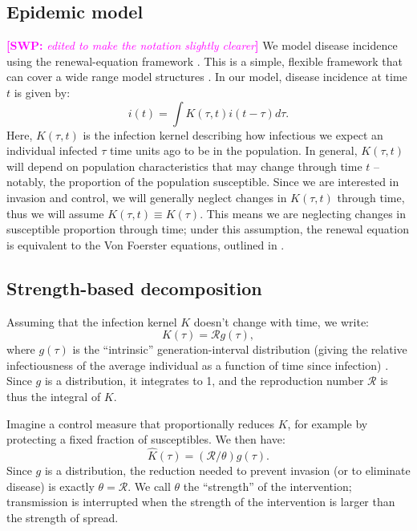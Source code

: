 \documentclass{article}\usepackage[]{graphicx}\usepackage[]{color}
\newcommand{\comment}[3]{\textcolor{#1}{\textbf{[#2: }\textit{#3}\textbf{]}}}
\newcommand{\swp}[1]{\comment{magenta}{SWP}{#1}}
\newcommand{\RR}{\ensuremath{{\mathcal R}}}
\newcommand{\eqlab}[1]{\label{eq:#1}}
\begin{document}
\subsection{Epidemic model}

\swp{edited to make the notation slightly clearer}
We model disease incidence using the renewal-equation framework \citep{champredon2015intrinsic}. 
This is a simple, flexible framework that can cover a wide range model structures \citep{Champredon2018equivalence}.
In our model, disease incidence at time $t$ is given by:
\begin{equation}
i(t) = \int K(\tau, t) i(t-\tau) d\tau.
\end{equation}
Here, $K(\tau, t)$ is the infection kernel describing how infectious we expect an individual infected $\tau$ time units ago to be in the population.
In general, $K(\tau, t)$ will depend on population characteristics that may change through time $t$ -- notably, the proportion of the population susceptible.
Since we are interested in invasion and control, we will generally neglect changes in $K(\tau, t)$ through time, thus we will assume $K(\tau, t) \equiv K(\tau)$. 
This means we are neglecting changes in susceptible proportion through time;
under this assumption, the renewal equation is equivalent to the Von Foerster equations, outlined in \cite{fraser2004factors}.

\subsection{Strength-based decomposition}

Assuming that the infection kernel $K$ doesn't change with time, we write:
\begin{equation}
	K(\tau) = \RR g(\tau),
	\eqlab{strength}
\end{equation}
where $g(\tau)$ is the ``intrinsic'' generation-interval distribution (giving the relative infectiousness of the average individual as a function of time since infection) \citep{champredon2015intrinsic}. 
Since $g$ is a distribution, it integrates to 1, and the reproduction number $\RR$ is thus the integral of $K$.

Imagine a control measure that proportionally reduces $K$, for example by protecting a fixed fraction of susceptibles. We then have:
\begin{equation}
	\hat K(\tau) = (\RR/\theta) g(\tau).
\end{equation}
Since $g$ is a distribution, the reduction needed to prevent invasion (or to eliminate disease)  is exactly $\theta=\RR$. We call $\theta$ the ``strength'' of the intervention; transmission is interrupted when the strength of the intervention is larger than the strength of spread.
\end{document}
